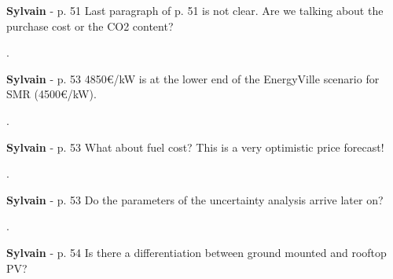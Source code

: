 \documentclass[12pt,a4paper]{article}
\begin{document}
\begin{mdframed}[style=comment] %
{\color{purple} \textbf{Sylvain}} - p. 51 Last paragraph of p. 51 is not clear. Are we talking about the purchase cost or the CO2 content?
\end{mdframed}

\noindent {\color{blue} }.

\begin{mdframed}[style=manuscript] %

\end{mdframed}

\begin{mdframed}[style=comment] %
{\color{purple} \textbf{Sylvain}} - p. 53 4850€/kW is at the lower end of the EnergyVille scenario for SMR (4500€/kW).
\end{mdframed}

\noindent {\color{blue} }.

\begin{mdframed}[style=manuscript] %

\end{mdframed}

\begin{mdframed}[style=comment] %
{\color{purple} \textbf{Sylvain}} - p. 53 What about fuel cost? This is a very optimistic price forecast! 
\end{mdframed}

\noindent {\color{blue} }.

\begin{mdframed}[style=manuscript] %

\end{mdframed}

\begin{mdframed}[style=comment] %
{\color{purple} \textbf{Sylvain}} - p. 53 Do the parameters of the uncertainty analysis arrive later on?
\end{mdframed}

\noindent {\color{blue} }.

\begin{mdframed}[style=manuscript] %

\end{mdframed}

\begin{mdframed}[style=comment] %
{\color{purple} \textbf{Sylvain}} - p. 54 Is there a differentiation between ground mounted and rooftop PV?
\end{mdframed}
\end{document}
